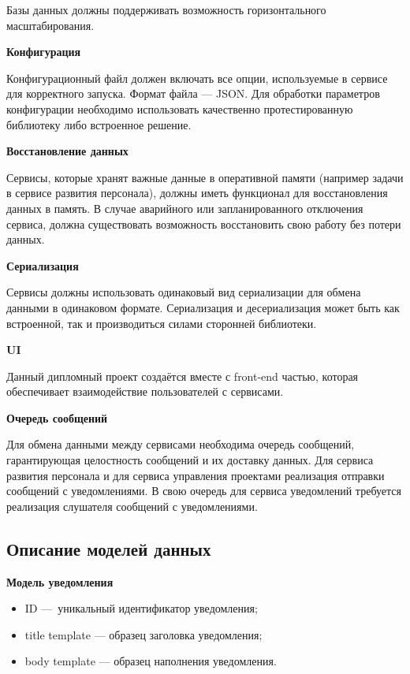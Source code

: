 Базы данных должны поддерживать возможность горизонтального масштабирования.

\bigskip
\textbf{Конфигурация}

Конфигурационный файл должен включать все опции, используемые в сервисе для корректного запуска. Формат файла — JSON. Для обработки параметров конфигурации необходимо использовать качественно протестированную библиотеку либо встроенное решение.

\bigskip
\textbf{Восстановление данных}

Сервисы, которые хранят важные данные в оперативной памяти (например задачи в сервисе развития персонала), должны иметь функционал для восстановления данных в память. В случае аварийного или запланированного отключения сервиса, должна существовать возможность восстановить свою работу без потери данных.

\bigskip
\textbf{Сериализация}

Сервисы должны использовать одинаковый вид сериализации для обмена данными в одинаковом формате. Сериализация и десериализация может быть как встроенной, так и производиться силами сторонней библиотеки.

\bigskip
\textbf{UI}

Данный дипломный проект создаётся вместе с front-end частью, которая обеспечивает взаимодействие пользователей с сервисами.

\bigskip
\textbf{Очередь сообщений}

Для обмена данными между сервисами необходима очередь сообщений, гарантирующая целостность сообщений и их доставку данных. Для сервиса развития персонала и для сервиса управления проектами реализация отправки сообщений с уведомлениями. В свою очередь для сервиса уведомлений требуется реализация слушателя сообщений с уведомлениями.

\subsection{Описание моделей данных}\label{sec:domain:models}

\textbf{Модель уведомления}

\begin{itemize}
    \item ID — уникальный идентификатор уведомления;
    \item title template — образец заголовка уведомления;
    \item body template — образец наполнения уведомления.
\end{itemize}

